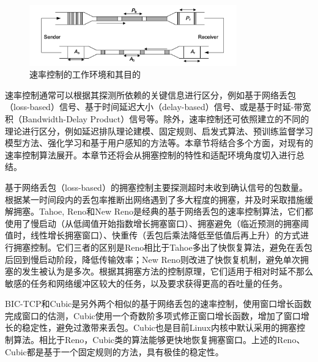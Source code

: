 \begin{figure} [ht]
\centering
\includegraphics[width=0.8\textwidth]{figures/chap02/sending.png} 
\caption{速率控制的工作环境和其目的\cite{author2024performance}}
\label{fig:sending}
\end{figure}


速率控制通常可以根据其探测所依赖的关键信息进行区分，例如基于网络丢包（loss-based）信号、基于时间延迟大小（delay-based）信号、或是基于时延-带宽积（Bandwidth-Delay Product）信号等。除外，速率控制还可依照建立的不同的理论进行区分，例如延迟排队理论建模、固定规则、启发式算法、预训练监督学习模型方法、强化学习和基于用户感知的方法等。本章节将结合多个方面，对现有的速率控制算法展开。本章节还将会从拥塞控制的特性和适配环境角度切入进行总结。

基于网络丢包（loss-based）的拥塞控制主要探测超时未收到确认信号的包数量。根据某一时间段内的丢包率推断出网络遇到了多大程度的拥塞，并及时采取措施缓解拥塞。Tahoe\cite{jasim2018old}, Reno\cite{yang2000general}和New Reno\cite{fall1996simulation}是经典的基于网络丢包的速率控制算法，它们都使用了慢启动（从低阈值开始指数增长拥塞窗口）、拥塞避免（临近预测的拥塞阈值时，线性增长拥塞窗口）、快重传（丢包后乘法降低至低值后再上升）的方式进行拥塞控制。它们三者的区别是Reno相比于Tahoe多出了快恢复算法，避免在丢包后回到慢启动阶段，降低传输效率；New Reno则改进了快恢复机制，避免单次拥塞的发生被认为是多次。根据其拥塞方法的控制原理，它们适用于相对时延不那么敏感的任务和网络缓冲区较大的任务，以及要求获得更高的吞吐量的任务。

BIC-TCP\cite{xu2004binary}和Cubic\cite{ha2008cubic}是另外两个相似的基于网络丢包的速率控制，使用窗口增长函数完成窗口的估测，Cubic使用一个奇数阶多项式修正窗口增长函数，增加了窗口增长的稳定性，避免过激带来丢包。Cubic也是目前Linux内核中默认采用的拥塞控制算法。相比于Reno，Cubic类的算法能够更快地恢复拥塞窗口。上述的Reno、Cubic都是基于一个固定规则的方法，具有极佳的稳定性。

